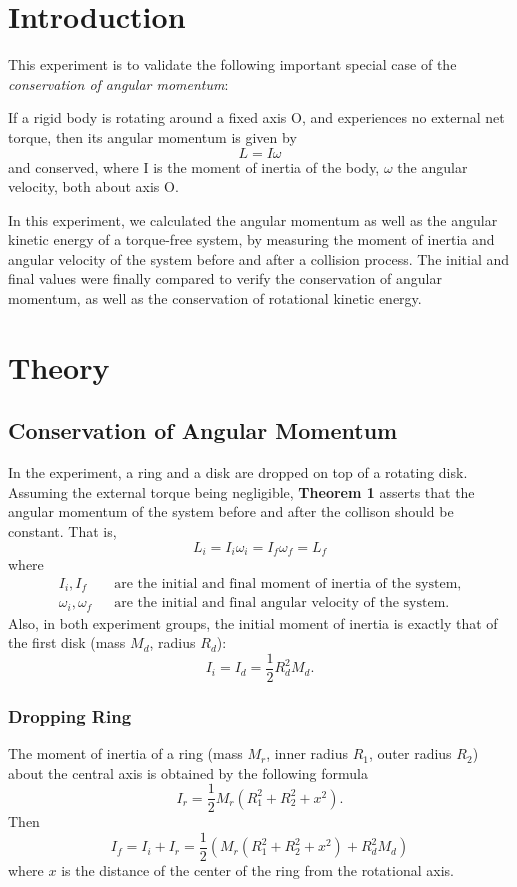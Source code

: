 

\rmfamily

\section{Introduction}

This experiment is to validate the following important special case of the \textit{conservation of angular momentum}:
\\
\begin{thm}[]
	If a rigid body is rotating around a fixed axis O, and experiences no external net torque, then its angular momentum is given by
	$$
	L = I\omega
	$$
	and conserved, where I is the moment of inertia of the body, $\omega$ the angular velocity, both about axis O.
\end{thm}
In this experiment, we calculated the angular momentum as well as the angular kinetic energy of a torque-free system, by measuring the moment of inertia and angular velocity of the system before and after a collision process. The initial and final values were finally compared to verify the conservation of angular momentum, as well as the conservation of rotational kinetic energy.

\section{Theory}

\subsection{Conservation of Angular Momentum}
In the experiment, a ring and a disk are dropped on top of a rotating disk. Assuming the external torque being negligible, \textbf{Theorem 1} asserts that the angular momentum of the system before and after the collison should be constant. That is,
$$
L_i=I_i\omega_i=I_f\omega_f=L_f
$$
where
$$
\begin{aligned}
I_i,I_f&\ \ \text{ are the initial and final moment of inertia of the system},\\
\omega_i,\omega_f&\ \ \text{ are the initial and final angular velocity of the system}.
\end{aligned}
$$
Also, in both experiment groups, the initial moment of inertia is exactly that of the first disk (mass $M_d$, radius $R_d$):
$$
I_i = I_{d}=\frac{1}{2}R_d^2M_d.
$$
\subsubsection{Dropping Ring}
The moment of inertia of a ring (mass $M_r$, inner radius $R_1$, outer radius $R_2$) about the central axis is obtained by the following formula
$$
I_r = \frac12 M_r(R_1^2+R_2^2+x^2).
$$
Then
$$
I_f = I_i + I_r=\frac12 \left(M_r(R_1^2+R_2^2+x^2)+R_d^2M_d\right)
$$
where $x$ is the distance of the center of the ring from the rotational axis.
